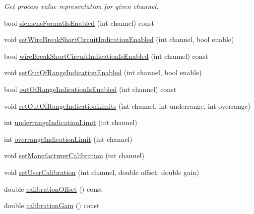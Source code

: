 \begin{DoxyCompactItemize}
\begin{DoxyCompactList}\small\item\em Get process value representation for given channel. \end{DoxyCompactList}\item 
bool \hyperlink{classmdt_device_modbus_wago_module_rtd_a0815ffe86f6c8c1a437af2b87f14ea60}{siemens\-Format\-Is\-Enabled} (int channel) const 
\item 
void \hyperlink{classmdt_device_modbus_wago_module_rtd_a5562d06610347baae6a9e6b639142d80}{set\-Wire\-Break\-Short\-Circuit\-Indication\-Enabled} (int channel, bool enable)
\item 
bool \hyperlink{classmdt_device_modbus_wago_module_rtd_a01ed3710a2f7a22a686fa06fd747219a}{wire\-Break\-Short\-Circuit\-Indication\-Is\-Enabled} (int channel) const 
\item 
void \hyperlink{classmdt_device_modbus_wago_module_rtd_a0ff6dacdf0f7b4b079e46f51341822d9}{set\-Out\-Of\-Range\-Indication\-Enabled} (int channel, bool enable)
\item 
bool \hyperlink{classmdt_device_modbus_wago_module_rtd_aaf6560fbb5cd285c072cf5df1dfad803}{out\-Of\-Range\-Indication\-Is\-Enabled} (int channel) const 
\item 
void \hyperlink{classmdt_device_modbus_wago_module_rtd_ab99db407dd15a4250e41168e5c592a3e}{set\-Out\-Of\-Range\-Indication\-Limits} (int channel, int underrange, int overrange)
\item 
int \hyperlink{classmdt_device_modbus_wago_module_rtd_ac3ebf8a90c7f87e1de7b45ea99ca3eac}{underrange\-Indication\-Limit} (int channel)
\item 
int \hyperlink{classmdt_device_modbus_wago_module_rtd_ad213401994beb43511ef70ca14098b9d}{overrange\-Indication\-Limit} (int channel)
\item 
void \hyperlink{classmdt_device_modbus_wago_module_rtd_add51b8d17f05661fa4e439f024094738}{set\-Manufacturer\-Calibration} (int channel)
\item 
void \hyperlink{classmdt_device_modbus_wago_module_rtd_a74188cf0391b3875adc599055bc8d459}{set\-User\-Calibration} (int channel, double offset, double gain)
\item 
double \hyperlink{classmdt_device_modbus_wago_module_rtd_a675d78379e2a0727f8d250499d7d82ca}{calibration\-Offset} () const 
\item 
double \hyperlink{classmdt_device_modbus_wago_module_rtd_a22e025ae3b60ae3dce4632ca2ea86b6c}{calibration\-Gain} () const 
\item 

\end{DoxyCompactItemize}
